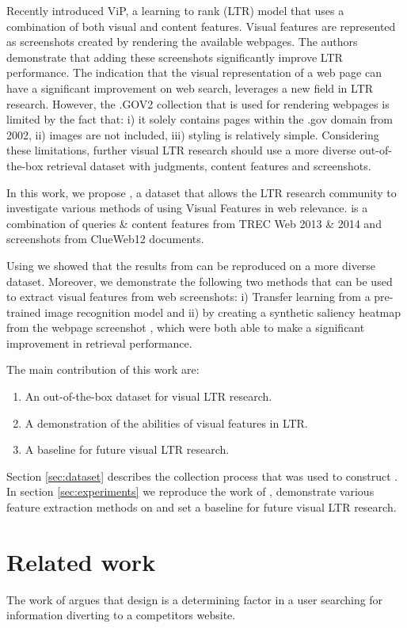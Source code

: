 Recently \citet{fan2017learning} introduced ViP, a learning to rank (LTR) model that uses a combination of both visual and content features. Visual features are represented as screenshots created by rendering the available webpages. The authors demonstrate that adding these screenshots significantly improve LTR performance. The indication that the visual representation of a web page can have a significant improvement on web search, leverages a new field in LTR research. 
However, the .GOV2 collection that is used for rendering webpages is limited by the fact that: i) it solely contains pages within the .gov domain from 2002, ii) images are not included, iii) styling is relatively simple. Considering these limitations, further visual LTR research should use a more diverse out-of-the-box retrieval dataset with judgments, content features and screenshots. 

In this work, we propose \datasetname, a dataset that allows the LTR research community to investigate various methods of using Visual Features in web relevance. \datasetname is a combination of queries \& content features from TREC Web 2013 \& 2014 and screenshots from ClueWeb12 documents. 

Using \datasetname we showed that the results from \citet{fan2017learning} can be reproduced on a more diverse dataset. Moreover, we demonstrate the following two methods that can be used to extract visual features from web screenshots: i) Transfer learning from a pre-trained image recognition model and \cite{2014decaf}  ii) by creating a synthetic saliency heatmap from the webpage screenshot \cite{shen2014webpage}\cite{shan2017two}, which were both able to make a significant improvement in retrieval performance. 

The main contribution of this work are:
\begin{enumerate}  
\item An out-of-the-box dataset for visual LTR research.
\item A demonstration of the abilities of visual features in LTR.
\item A baseline for future visual LTR research.
\end{enumerate}

Section \ref{sec:dataset} describes the collection process that was used to construct \datasetname. In section \ref{sec:experiments} we reproduce the work of \citet{fan2017learning}, demonstrate various feature extraction methods on \datasetname and set a baseline for future visual LTR research.  
\section{Related work}\label{sec:relatedwork}
The work of \citet{nielsen1999designing} argues that design is a determining factor in a user searching for information diverting to a competitors website. 

